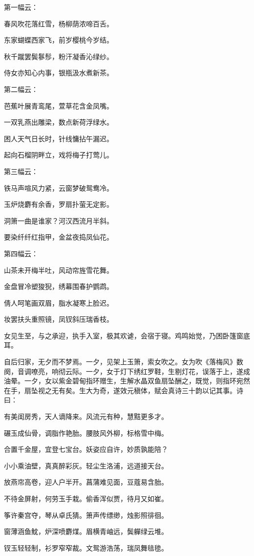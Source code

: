\documentclass[a4paper,12pt,UTF8,twoside]{ctexbook}
\begin{document}
第一幅云：

春风吹花落红雪，杨柳荫浓啼百舌。

东家蝴蝶西家飞，前岁樱桃今岁结。

秋千蹴罢鬓鬖髿，粉汗凝香沁绿纱。

侍女亦知心内事，银瓶汲水煮新茶。

第二幅云：

芭蕉叶展青鸾尾，萱草花含金凤嘴。

一双乳燕出雕梁，数点新荷浮绿水。

困人天气日长时，针线慵拈午漏迟。

起向石榴阴畔立，戏将梅子打莺儿。

第三幅云：

铁马声喧风力紧，云窗梦破鸳鸯冷。

玉炉烧麝有余香，罗扇扑萤无定影。

洞箫一曲是谁家？河汉西流月半斜。

要染纤纤红指甲，金盆夜捣凤仙花。

第四幅云：

山茶未开梅半吐，风动帘旌雪花舞。

金盘冒冷塑狻猊，绣幕围春护鹦鹉。

倩人呵笔画双眉，脂水凝寒上脸迟。

妆罢扶头重照镜，凤钗斜压瑞香枝。

女见生至，与之承迎，执手入室，极其欢谑，会宿于寝。鸡鸣始觉，乃困卧篷窗底耳。

自后归家，无夕而不梦焉。一夕，见架上玉箫，索女吹之。女为吹《落梅风》数阕，音调嘹亮，响彻云际。一夕，女于灯下绣红罗鞋，生剔灯花，误落于上，遂成油晕。一夕，女以紫金碧甸指环赠生，生解水晶双鱼扇坠酬之，既觉，则指环宛然在手，扇坠视之无有矣。生大为奇，遂效元稹体，赋会真诗三十韵以记其事。诗曰：

有美闺房秀，天人谪降来。风流元有种，慧黠更多才。

碾玉成仙骨，调脂作艳胎。腰肢风外柳，标格雪中梅。

合置千金屋，宜登七宝台。妖姿应自许，妙质孰能陪？

小小乘油壁，真真醉彩灰。轻尘生洛浦，远道接天台。

放燕帘高卷，迎人户半开。菖蒲难见面，豆蔻易含胎。

不待金屏射，何劳玉手栽。偷香浑似贾，待月又如崔。

筝许秦宫夺，琴从卓氏猜。箫声传缥缈，烛影照徘徊。

窗薄涵鱼魫，炉深喷麝煤。眉横青岫远，鬓軃绿云堆。

钗玉轻轻制，衫罗窄窄裁。文鸳游浩荡，瑞凤舞毰毶。
\end{document}
